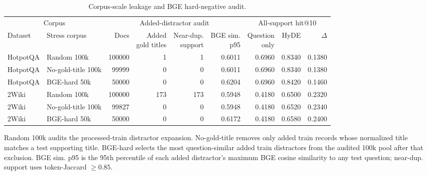 \begin{table}[t]
\centering
\caption{Corpus-scale leakage and BGE hard-negative audit.}
\label{tab:corpus_scale_audit}
\footnotesize
\begin{threeparttable}
\setlength{\tabcolsep}{2.3pt}
\renewcommand{\arraystretch}{1.12}
\begin{tabularx}{\textwidth}{@{}l l r r r r r r r@{}}
\toprule
\multicolumn{2}{c}{Corpus} & \multicolumn{4}{c}{Added-distractor audit} & \multicolumn{3}{c}{All-support hit@10} \\
\cmidrule(lr){1-2}\cmidrule(lr){3-6}\cmidrule(lr){7-9}
Dataset & Stress corpus & Docs & \shortstack{Added\\gold titles} & \shortstack{Near-dup.\\support} & \shortstack{BGE sim.\\p95} & \shortstack{Question\\only} & HyDE & $\Delta$ \\
\midrule
HotpotQA & Random 100k & 100000 & 1 & 1 & 0.6011 & 0.6960 & 0.8340 & 0.1380 \\
HotpotQA & No-gold-title 100k & 99999 & 0 & 0 & 0.6011 & 0.6960 & 0.8340 & 0.1380 \\
HotpotQA & BGE-hard 50k & 50000 & 0 & 0 & 0.6204 & 0.6960 & 0.8420 & 0.1460 \\
2Wiki & Random 100k & 100000 & 173 & 173 & 0.5948 & 0.4180 & 0.6500 & 0.2320 \\
2Wiki & No-gold-title 100k & 99827 & 0 & 0 & 0.5948 & 0.4180 & 0.6520 & 0.2340 \\
2Wiki & BGE-hard 50k & 50000 & 0 & 0 & 0.6172 & 0.4180 & 0.6580 & 0.2400 \\
\bottomrule
\end{tabularx}
\begin{tablenotes}
\footnotesize
\item Random 100k audits the processed-train distractor expansion. No-gold-title removes only added train records whose normalized title matches a test supporting title. BGE-hard selects the most question-similar added train distractors from the audited 100k pool after that exclusion. BGE sim. p95 is the 95th percentile of each added distractor's maximum BGE cosine similarity to any test question; near-dup. support uses token-Jaccard $\ge 0.85$.
\end{tablenotes}
\end{threeparttable}
\end{table}
